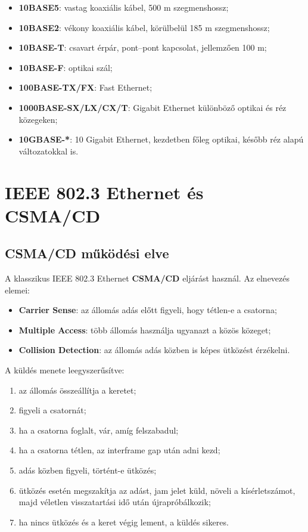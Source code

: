 \begin{itemize}
  \item \textbf{10BASE5}: vastag koaxiális kábel, 500 m szegmenshossz;
  \item \textbf{10BASE2}: vékony koaxiális kábel, körülbelül 185 m szegmenshossz;
  \item \textbf{10BASE-T}: csavart érpár, pont--pont kapcsolat, jellemzően 100 m;
  \item \textbf{10BASE-F}: optikai szál;
  \item \textbf{100BASE-TX/FX}: Fast Ethernet;
  \item \textbf{1000BASE-SX/LX/CX/T}: Gigabit Ethernet különböző optikai és réz közegeken;
  \item \textbf{10GBASE-*}: 10 Gigabit Ethernet, kezdetben főleg optikai, később réz alapú változatokkal is.
\end{itemize}

\begin{center}

\end{center}

\section{IEEE 802.3 Ethernet és CSMA/CD}

\subsection{CSMA/CD működési elve}

A klasszikus IEEE 802.3 Ethernet \textbf{CSMA/CD} eljárást használ. Az elnevezés elemei:

\begin{itemize}
  \item \textbf{Carrier Sense}: az állomás adás előtt figyeli, hogy tétlen-e a csatorna;
  \item \textbf{Multiple Access}: több állomás használja ugyanazt a közös közeget;
  \item \textbf{Collision Detection}: az állomás adás közben is képes ütközést érzékelni.
\end{itemize}

A küldés menete leegyszerűsítve:

\begin{enumerate}
  \item az állomás összeállítja a keretet;
  \item figyeli a csatornát;
  \item ha a csatorna foglalt, vár, amíg felszabadul;
  \item ha a csatorna tétlen, az interframe gap után adni kezd;
  \item adás közben figyeli, történt-e ütközés;
  \item ütközés esetén megszakítja az adást, jam jelet küld, növeli a kísérletszámot, majd véletlen visszatartási idő után újrapróbálkozik;
  \item ha nincs ütközés és a keret végig lement, a küldés sikeres.
\end{enumerate}

